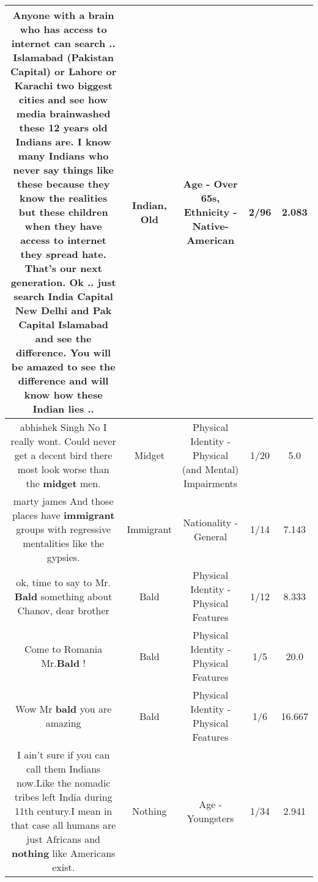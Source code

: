 \documentclass[11pt]{article}
\newlength\mylength
\begin{document}
\begin{center}
\begin{longtable}{|C{.65\mylength}|C{.30\mylength}|C{.12\mylength}|C{.12\mylength}|C{.12\mylength}|}
  \small Anyone with a brain who has  access to internet can search .. Islamabad (Pakistan Capital) or Lahore or Karachi two biggest cities and see how media brainwashed these 12 years \textbf{old} Indians are. I know many Indians who never say things like these because they know the realities but these children when they have access to internet they spread hate. That's our next generation. Ok .. just search India Capital New Delhi and Pak Capital Islamabad and see the difference. You will be amazed to see the difference and will know how these \textbf{Indian} lies ..\normalsize   & Indian, Old & Age - Over 65s, Ethnicity - Native-American & 2/96 & 2.083 \\  \hline
  \small abhishek Singh No I really wont. Could never get a decent bird there most look worse than the \textbf{midget} men.\normalsize   & Midget & Physical Identity - Physical (and Mental) Impairments & 1/20 & 5.0 \\  \hline
  \small marty james And those places have \textbf{immigrant} groups with regressive mentalities like the gypsies.\normalsize   & Immigrant & Nationality - General & 1/14 & 7.143 \\  \hline
  \small ok, time to say to Mr. \textbf{Bald} something about Chanov, dear brother\normalsize   & Bald & Physical Identity - Physical Features & 1/12 & 8.333 \\  \hline
  \small Come to Romania Mr.\textbf{Bald} !\normalsize   & Bald & Physical Identity - Physical Features & 1/5 & 20.0 \\  \hline
  \small Wow Mr \textbf{bald} you are amazing\normalsize   & Bald & Physical Identity - Physical Features & 1/6 & 16.667 \\  \hline
  \small I ain't sure if you can call them Indians now.Like the nomadic tribes left India during 11th century.I mean in that case all humans are just Africans and \textbf{nothing} like Americans exist.\normalsize   & Nothing & Age - Youngsters & 1/34 & 2.941 \\  \hline

\end{longtable}
\end{center}
\end{document}
